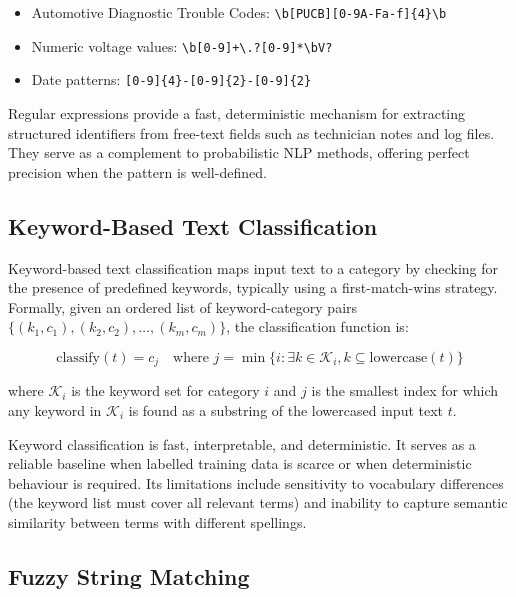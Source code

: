 \documentclass[10pt,a4paper]{article}
\begin{document}
\begin{itemize}
    \item Automotive Diagnostic Trouble Codes: \texttt{\textbackslash b[PUCB][0-9A-Fa-f]\{4\}\textbackslash b}
    \item Numeric voltage values: \texttt{\textbackslash b[0-9]+\textbackslash.?[0-9]*\textbackslash bV?}
    \item Date patterns: \texttt{[0-9]\{4\}-[0-9]\{2\}-[0-9]\{2\}}
\end{itemize}

Regular expressions provide a fast, deterministic mechanism for extracting structured identifiers from free-text fields such as technician notes and log files. They serve as a complement to probabilistic NLP methods, offering perfect precision when the pattern is well-defined.

\subsection{Keyword-Based Text Classification}
\label{sec:keyword-classification}

Keyword-based text classification maps input text to a category by checking for the presence of predefined keywords, typically using a first-match-wins strategy. Formally, given an ordered list of keyword-category pairs $\{(k_1, c_1), (k_2, c_2), \ldots, (k_m, c_m)\}$, the classification function is:

\begin{equation}
\text{classify}(t) = c_j \quad \text{where } j = \min\{i : \exists k \in \mathcal{K}_i, k \subseteq \text{lowercase}(t)\}
\label{eq:keyword-classify}
\end{equation}

where $\mathcal{K}_i$ is the keyword set for category $i$ and $j$ is the smallest index for which any keyword in $\mathcal{K}_i$ is found as a substring of the lowercased input text $t$.

Keyword classification is fast, interpretable, and deterministic. It serves as a reliable baseline when labelled training data is scarce or when deterministic behaviour is required. Its limitations include sensitivity to vocabulary differences (the keyword list must cover all relevant terms) and inability to capture semantic similarity between terms with different spellings.

\subsection{Fuzzy String Matching}
\label{sec:fuzzy-matching}
\end{document}

